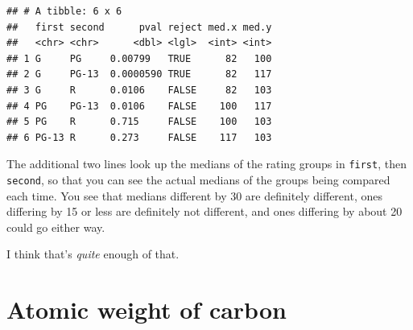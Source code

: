 \documentclass[]{tufte-book}
\newenvironment{Shaded}{}{}
\newcommand{\DataTypeTok}[1]{\textcolor[rgb]{0.56,0.13,0.00}{#1}}
\newcommand{\DecValTok}[1]{\textcolor[rgb]{0.25,0.63,0.44}{#1}}
\newcommand{\FloatTok}[1]{\textcolor[rgb]{0.25,0.63,0.44}{#1}}
\newcommand{\KeywordTok}[1]{\textcolor[rgb]{0.00,0.44,0.13}{\textbf{#1}}}
\newcommand{\NormalTok}[1]{#1}
\newcommand{\OperatorTok}[1]{\textcolor[rgb]{0.40,0.40,0.40}{#1}}
\newcommand{\StringTok}[1]{\textcolor[rgb]{0.25,0.44,0.63}{#1}}
\theoremstyle{definition}
\theoremstyle{definition}
\theoremstyle{definition}
\theoremstyle{remark}
\begin{document}
\begin{Shaded}
\end{Shaded}

\begin{verbatim}
## # A tibble: 6 x 6
##   first second      pval reject med.x med.y
##   <chr> <chr>      <dbl> <lgl>  <int> <int>
## 1 G     PG     0.00799   TRUE      82   100
## 2 G     PG-13  0.0000590 TRUE      82   117
## 3 G     R      0.0106    FALSE     82   103
## 4 PG    PG-13  0.0106    FALSE    100   117
## 5 PG    R      0.715     FALSE    100   103
## 6 PG-13 R      0.273     FALSE    117   103
\end{verbatim}

The additional two lines look up the medians of the rating groups in
\texttt{first}, then \texttt{second}, so that you can see the actual
medians of the groups being compared each time. You see that medians
different by 30 are definitely different, ones differing by 15 or less
are definitely not different, and ones differing by about 20 could go
either way.

I think that's \emph{quite} enough of that.

\hypertarget{atomic-weight-of-carbon}{%
\section{Atomic weight of carbon}\label{atomic-weight-of-carbon}}
\end{document}
